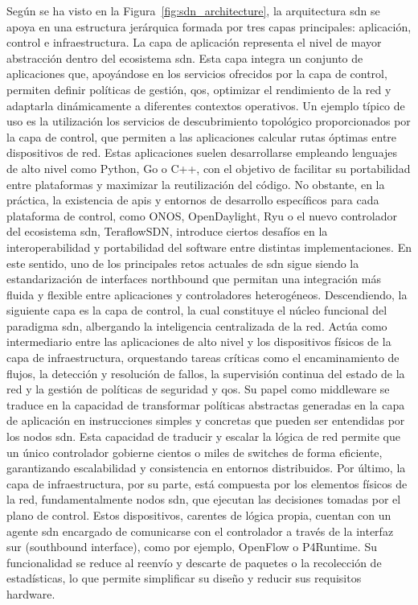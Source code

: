 Según se ha visto en la Figura~\ref{fig:sdn_architecture}, la arquitectura \gls{sdn} se apoya en una estructura jerárquica formada por tres capas principales: aplicación, control e infraestructura. La capa de aplicación representa el nivel de mayor abstracción dentro del ecosistema \gls{sdn}. Esta capa integra un conjunto de aplicaciones que, apoyándose en los servicios ofrecidos por la capa de control, permiten definir políticas de gestión, \gls{qos}, optimizar el rendimiento de la red y adaptarla dinámicamente a diferentes contextos operativos. Un ejemplo típico de uso es la utilización los servicios de descubrimiento topológico proporcionados por la capa de control, que permiten a las aplicaciones calcular rutas óptimas entre dispositivos de red. Estas aplicaciones suelen desarrollarse empleando lenguajes de alto nivel como Python, Go o C++, con el objetivo de facilitar su portabilidad entre plataformas y maximizar la reutilización del código. No obstante, en la práctica, la existencia de \glspl{api} y entornos de desarrollo específicos para cada plataforma de control, como ONOS, OpenDaylight, Ryu o el nuevo controlador del ecosistema \gls{sdn}, TeraflowSDN, introduce ciertos desafíos en la interoperabilidad y portabilidad del software entre distintas implementaciones. En este sentido, uno de los principales retos actuales de \gls{sdn} sigue siendo la estandarización de interfaces northbound que permitan una integración más fluida y flexible entre aplicaciones y controladores heterogéneos. Descendiendo, la siguiente capa es la capa de control, la cual constituye el núcleo funcional del paradigma \gls{sdn}, albergando la inteligencia centralizada de la red. Actúa como intermediario entre las aplicaciones de alto nivel y los dispositivos físicos de la capa de infraestructura, orquestando tareas críticas como el encaminamiento de flujos, la detección y resolución de fallos, la supervisión continua del estado de la red y la gestión de políticas de seguridad y \gls{qos}. Su papel como middleware se traduce en la capacidad de transformar políticas abstractas generadas en la capa de aplicación en instrucciones simples y concretas que pueden ser entendidas por los nodos \gls{sdn}. Esta capacidad de traducir y escalar la lógica de red permite que un único controlador gobierne cientos o miles de switches de forma eficiente, garantizando escalabilidad y consistencia en entornos distribuidos. Por último, la capa de infraestructura, por su parte, está compuesta por los elementos físicos de la red, fundamentalmente nodos \gls{sdn}, que ejecutan las decisiones tomadas por el plano de control. Estos dispositivos, carentes de lógica propia, cuentan con un agente \gls{sdn} encargado de comunicarse con el controlador a través de la interfaz sur (southbound interface), como por ejemplo, OpenFlow o P4Runtime. Su funcionalidad se reduce al reenvío y descarte de paquetes o la recolección de estadísticas, lo que permite simplificar su diseño y reducir sus requisitos hardware.\\
